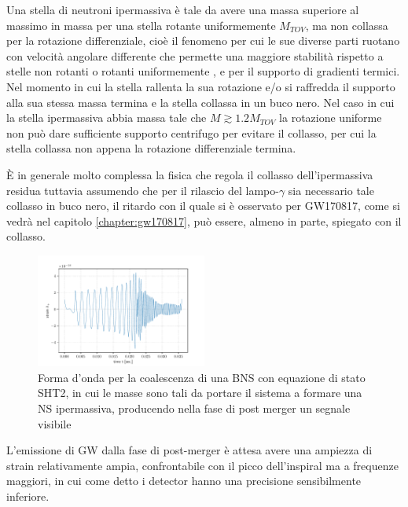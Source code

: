 Una stella di neutroni ipermassiva è tale da avere una massa superiore al massimo in massa per una stella rotante uniformemente $M_{TOV}$, ma non collassa per la rotazione differenziale, cioè il fenomeno per cui le sue diverse parti ruotano con velocità angolare differente che permette una maggiore stabilità rispetto a stelle non rotanti o rotanti uniformemente \cite{Baumgarte_2000}, e per il supporto di gradienti termici. Nel momento in cui la stella rallenta la sua rotazione e/o si raffredda il supporto alla sua stessa massa termina e la stella collassa in un buco nero. 
Nel caso in cui la stella ipermassiva abbia massa tale che $M \gtrsim 1.2 M_{TOV}$ la rotazione uniforme non può dare sufficiente supporto centrifugo per evitare il collasso, per cui la stella collassa non appena la rotazione differenziale termina.

È in generale molto complessa la fisica che regola il collasso dell'ipermassiva residua tuttavia assumendo che per il rilascio del lampo-$\gamma$ sia necessario tale collasso in buco nero, il ritardo con il quale si è osservato per GW170817, come si vedrà nel capitolo \ref{chapter:gw170817}, può essere, almeno in parte, spiegato con il collasso.

\begin{figure}
	\vspace{-20pt}
	\begin{center}
		\includegraphics[width=0.5\textwidth]{figures/Capitolo_1/SHT2.0.pdf}
	\end{center}
	\vspace{-10pt}
	\caption{Forma d'onda per la coalescenza di una BNS con equazione di stato SHT2, in cui le masse sono tali da portare il sistema a formare una NS ipermassiva, producendo nella fase di post merger un segnale visibile}
	\label{fig:FormaOndaToNS}
	\vspace{-20pt}
\end{figure}

L'emissione di GW dalla fase di post-merger è attesa avere una ampiezza di strain relativamente ampia, confrontabile con il picco dell'inspiral ma a frequenze maggiori, in cui come detto i detector hanno una precisione sensibilmente inferiore.

